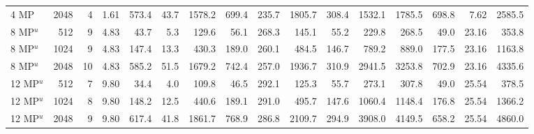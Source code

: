 \documentclass[10pt]{article}
\begin{document}
\begin{table}[!htbp]
\begin{tabular}{@{}lrrrrrrrrrrrrrrr@{}}
4 MP & 2048 & 4 & 1.61 & 573.4 & 43.7 & 1578.2 & 699.4 & 235.7 & 1805.7 & 308.4 & 1532.1 & 1785.5 & 698.8 & 7.62 & 2585.5 \\
8 MP$^{u}$ & 512 & 9 & 4.83 & 43.7 & 5.3 & 129.6 & 56.1 & 268.3 & 145.1 & 55.2 & 229.8 & 268.5 & 49.0 & 23.16 & 353.8 \\
8 MP$^{u}$ & 1024 & 9 & 4.83 & 147.4 & 13.3 & 430.3 & 189.0 & 260.1 & 484.5 & 146.7 & 789.2 & 889.0 & 177.5 & 23.16 & 1163.8 \\
8 MP$^{u}$ & 2048 & 10 & 4.83 & 585.2 & 51.5 & 1679.2 & 742.4 & 257.0 & 1936.7 & 310.9 & 2941.5 & 3253.8 & 702.9 & 23.16 & 4335.6 \\
12 MP$^{u}$ & 512 & 7 & 9.80 & 34.4 & 4.0 & 109.8 & 46.5 & 292.1 & 125.3 & 55.7 & 273.1 & 307.8 & 49.0 & 25.54 & 378.5 \\
12 MP$^{u}$ & 1024 & 8 & 9.80 & 148.2 & 12.5 & 440.6 & 189.1 & 291.0 & 495.7 & 147.6 & 1060.4 & 1148.4 & 176.8 & 25.54 & 1366.2 \\
12 MP$^{u}$ & 2048 & 9 & 9.80 & 617.4 & 41.8 & 1861.7 & 768.9 & 286.8 & 2109.7 & 294.9 & 3908.0 & 4149.5 & 658.2 & 25.54 & 4860.0 \\
\bottomrule
\end{tabular}
\end{table}
\end{document}
